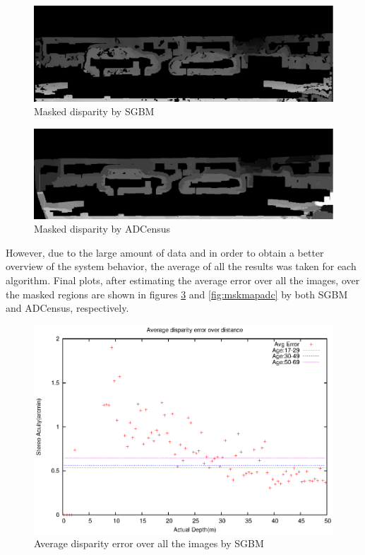 \begin{figure}[H]
\centering
\includegraphics[scale=0.35]{5mdispsgb}
\caption{Masked disparity by SGBM}
\label{fig:imgmsk}
\end{figure} 

\begin{figure}[H]
\centering
\includegraphics[scale=0.35]{5mdispadc}
\caption{Masked disparity by ADCensus}
\label{fig:imgmsk}
\end{figure} 

\noindent
However, due to the large amount of data and in order to obtain a better overview of 
the system behavior, the average of all the results 
was taken for each algorithm.
Final plots, after estimating the average error over all the images, over the masked regions
are shown in figures \ref{fig:mskmapsgbm} and \ref{fig:mskmapadc} by both SGBM and ADCensus, respectively.

\begin{figure}[H]
\centering
\includegraphics[scale=0.8]{sgbmmsk1000}
\caption{Average disparity error over all the images by SGBM}
\label{fig:mskmapsgbm}
\end{figure} 

